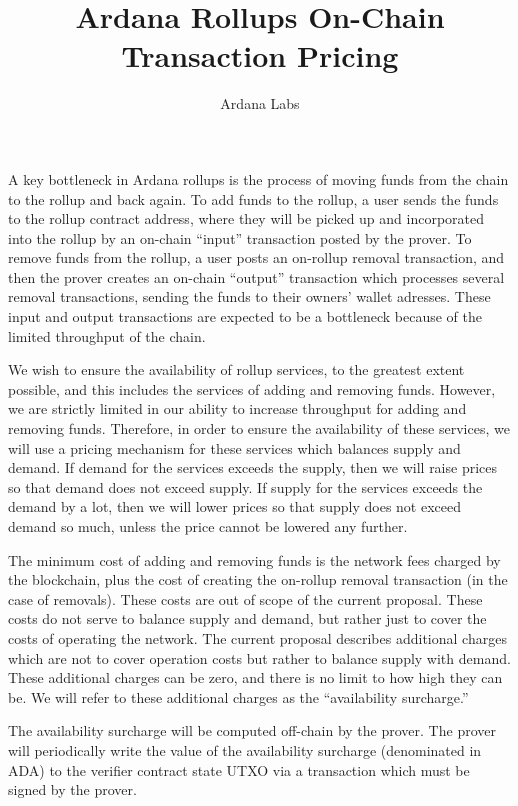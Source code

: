 \documentclass[12pt]{article}
\title{Ardana Rollups On-Chain Transaction Pricing}
\author{Ardana Labs}
\begin{document}
\maketitle


A key bottleneck in Ardana rollups is the process of moving funds from the chain to the rollup and back again. To add funds to the rollup, a user sends the funds to the rollup contract address, where they will be picked up and incorporated into the rollup by an on-chain ``input'' transaction posted by the prover. To remove funds from the rollup, a user posts an on-rollup removal transaction, and then the prover creates an on-chain ``output'' transaction which processes several removal transactions, sending the funds to their owners' wallet adresses. These input and output transactions are expected to be a bottleneck because of the limited throughput of the chain. 

We wish to ensure the availability of rollup services, to the greatest extent possible, and this includes the services of adding and removing funds. However, we are strictly limited in our ability to increase throughput for adding and removing funds. Therefore, in order to ensure the availability of these services, we will use a pricing mechanism for these services which balances supply and demand. If demand for the services exceeds the supply, then we will raise prices so that demand does not exceed supply. If supply for the services exceeds the demand by a lot, then we will lower prices so that supply does not exceed demand so much, unless the price cannot be lowered any further.

The minimum cost of adding and removing funds is the network fees charged by the blockchain, plus the cost of creating the on-rollup removal transaction (in the case of removals). These costs are out of scope of the current proposal. These costs do not serve to balance supply and demand, but rather just to cover the costs of operating the network. The current proposal describes additional charges which are not to cover operation costs but rather to balance supply with demand. These additional charges can be zero, and there is no limit to how high they can be. We will refer to these additional charges as the ``availability surcharge.''

The availability surcharge will be computed off-chain by the prover. The prover will periodically write the value of the availability surcharge (denominated in ADA) to the verifier contract state UTXO via a transaction which must be signed by the prover.
\end{document}
